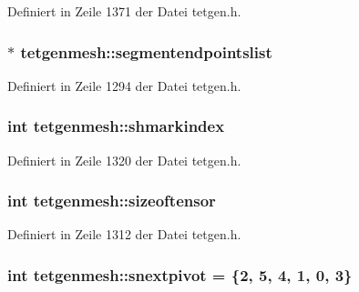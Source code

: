 Definiert in Zeile 1371 der Datei tetgen.\-h.

\hypertarget{classtetgenmesh_a94baa4b30f5978236d410519d2630f7a}{
\subsubsection[{segmentendpointslist}]{$\ast$ tetgenmesh\-::segmentendpointslist}}\label{classtetgenmesh_a94baa4b30f5978236d410519d2630f7a}


Definiert in Zeile 1294 der Datei tetgen.\-h.

\hypertarget{classtetgenmesh_a95a36881e979fdd33fce53dfe621dd27}{
\subsubsection[{shmarkindex}]{\setlength{\rightskip}{0pt plus 5cm}int tetgenmesh\-::shmarkindex}}\label{classtetgenmesh_a95a36881e979fdd33fce53dfe621dd27}


Definiert in Zeile 1320 der Datei tetgen.\-h.

\hypertarget{classtetgenmesh_a7b22b70662c2fe714e5eb9264c56c47b}{
\subsubsection[{sizeoftensor}]{\setlength{\rightskip}{0pt plus 5cm}int tetgenmesh\-::sizeoftensor}}\label{classtetgenmesh_a7b22b70662c2fe714e5eb9264c56c47b}


Definiert in Zeile 1312 der Datei tetgen.\-h.

\hypertarget{classtetgenmesh_a0d47762d99e1d47863062c532fe61122}{
\subsubsection[{snextpivot}]{\setlength{\rightskip}{0pt plus 5cm}int tetgenmesh\-::snextpivot = \{2, 5, 4, 1, 0, 3\}\hspace{0.3cm}{\ttfamily [static]}}}\label{classtetgenmesh_a0d47762d99e1d47863062c532fe61122}


